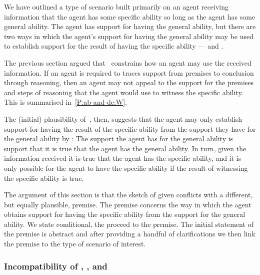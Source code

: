 \hozline{}

\begin{note}
  We have outlined a type of scenario built primarily on an agent receiving information that the agent has some specific ability so long as the agent has some general ability.
  The agent has support for having the general ability, but there are two ways in which the agent's support for having the general ability may be used to establish support for {\color{red} the result of having the specific ability} --- \AR{} and \WR{}.

  The previous section argued that~\ESU{} constrains how an agent may use the received information.
  If an agent is required to traces support from premises to conclusion through reasoning, then an agent may not appeal to the support for the premises and steps of reasoning that the agent would use to witness the specific ability.
  {\color{red} This is summarised in~\ref{P:ab-and-dc:W}.}

  The (initial) plausibility of~\ESU{}, then, suggests that the agent may only establish support for having the {\color{red} result of the specific ability} from the support they have for the general ability by \AR{}:
  The support the agent has for the general ability is support that it is true that the agent has the general ability.
  In turn, given the information received it is true that the agent has the specific ability, and it is only possible for the agent to have the specific ability if the result of witnessing the specific ability is true.

  The argument of this section is that the sketch of \AR{} given conflicts with a different, but equally plausible, premise.
  The premise concerns the way in which the agent obtains support for having the specific ability from the support for the general ability.
  We state conditional, the proceed to the premise.
  The initial statement of the premise is abstract and after providing a handful of clarifications we then link the premise to the type of scenario of interest.
\end{note}

\subsubsection{Incompatibility of \nI{}, \gsi{}, and \AR{}}
\label{sec:ni-summary}

